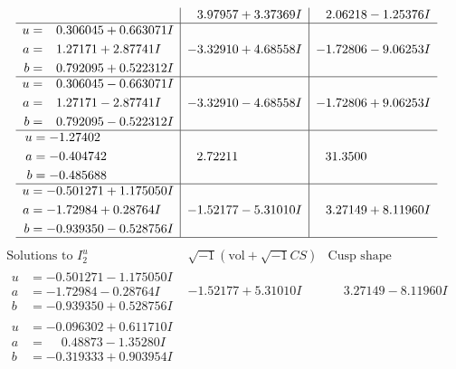 \documentclass[1p]{elsarticle_modified}
\theoremstyle{definition}
\newcommand{\I}{\sqrt{-1}}
\begin{document}
$$\begin{array}{c|c|c}
 & \phantom{-}3.97957 + 3.37369 I & \phantom{-}2.06218 - 1.25376 I \\ \hline\begin{aligned}
u &= \phantom{-}0.306045 + 0.663071 I \\
a &= \phantom{-}1.27171 + 2.87741 I \\
b &= \phantom{-}0.792095 + 0.522312 I\end{aligned}
 & -3.32910 + 4.68558 I & -1.72806 - 9.06253 I \\ \hline\begin{aligned}
u &= \phantom{-}0.306045 - 0.663071 I \\
a &= \phantom{-}1.27171 - 2.87741 I \\
b &= \phantom{-}0.792095 - 0.522312 I\end{aligned}
 & -3.32910 - 4.68558 I & -1.72806 + 9.06253 I \\ \hline\begin{aligned}
u &= -1.27402\phantom{ +0.000000I} \\
a &= -0.404742\phantom{ +0.000000I} \\
b &= -0.485688\phantom{ +0.000000I}\end{aligned}
 & \phantom{-}2.72211\phantom{ +0.000000I} & \phantom{-}31.3500\phantom{ +0.000000I} \\ \hline\begin{aligned}
u &= -0.501271 + 1.175050 I \\
a &= -1.72984 + 0.28764 I \\
b &= -0.939350 - 0.528756 I\end{aligned}
 & -1.52177 - 5.31010 I & \phantom{-}3.27149 + 8.11960 I\\
 \hline 
 \end{array}$$\newpage$$\begin{array}{c|c|c}  
\text{Solutions to }I^u_{2}& \I (\text{vol} + \sqrt{-1}CS) & \text{Cusp shape}\\
 \hline 
\begin{aligned}
u &= -0.501271 - 1.175050 I \\
a &= -1.72984 - 0.28764 I \\
b &= -0.939350 + 0.528756 I\end{aligned}
 & -1.52177 + 5.31010 I & \phantom{-}3.27149 - 8.11960 I \\ \hline\begin{aligned}
u &= -0.096302 + 0.611710 I \\
a &= \phantom{-}0.48873 - 1.35280 I \\
b &= -0.319333 + 0.903954 I\end{aligned}

\end{array}$$
\end{document}
